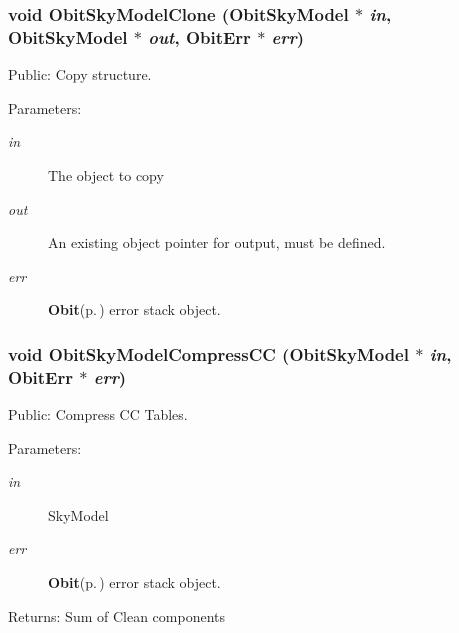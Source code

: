 \subsubsection{\setlength{\rightskip}{0pt plus 5cm}void Obit\-Sky\-Model\-Clone ({\bf Obit\-Sky\-Model} $\ast$ {\em in}, {\bf Obit\-Sky\-Model} $\ast$ {\em out}, {\bf Obit\-Err} $\ast$ {\em err})}\label{ObitSkyModel_8h_a56}


Public: Copy structure. 

\begin{Desc}
\item[Parameters:]
\begin{description}
\item[{\em in}]The object to copy \item[{\em out}]An existing object pointer for output, must be defined. \item[{\em err}]{\bf Obit}{\rm (p.\,\pageref{structObit})} error stack object. \end{description}
\end{Desc}
\subsubsection{\setlength{\rightskip}{0pt plus 5cm}void Obit\-Sky\-Model\-Compress\-CC ({\bf Obit\-Sky\-Model} $\ast$ {\em in}, {\bf Obit\-Err} $\ast$ {\em err})}\label{ObitSkyModel_8h_a68}


Public: Compress CC Tables. 

\begin{Desc}
\item[Parameters:]
\begin{description}
\item[{\em in}]Sky\-Model \item[{\em err}]{\bf Obit}{\rm (p.\,\pageref{structObit})} error stack object. \end{description}
\end{Desc}
\begin{Desc}
\item[Returns:]Sum of Clean components \end{Desc}
